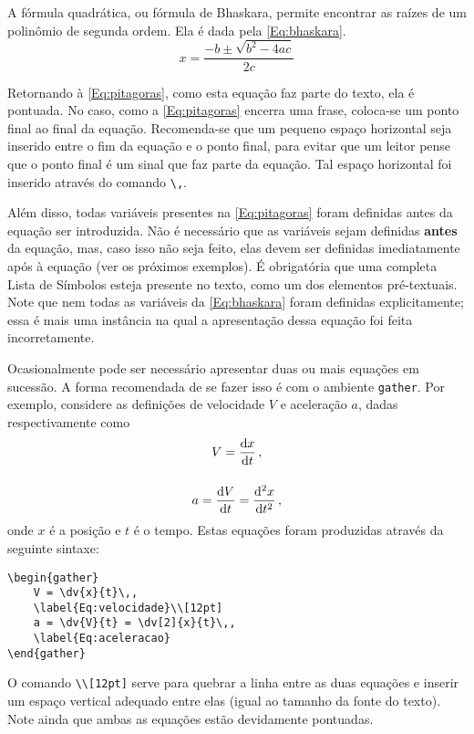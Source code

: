A fórmula quadrática, ou fórmula de Bhaskara, permite encontrar as raízes de um polinômio de segunda ordem. Ela é dada pela \cref{Eq:bhaskara}.
\begin{equation}
    x = \frac{-b \pm \sqrt{b^2 - 4ac}}{2c}
    \label{Eq:bhaskara}
\end{equation}

Retornando à \cref{Eq:pitagoras}, como esta equação faz parte do texto, ela é pontuada. No caso, como a \cref{Eq:pitagoras} encerra uma frase, coloca-se um ponto final ao final da equação. Recomenda-se que um pequeno espaço horizontal seja inserido entre o fim da equação e o ponto final, para evitar que um leitor pense que o ponto final é um sinal que faz parte da equação. Tal espaço horizontal foi inserido através do comando \lstinline!\,!.

Além disso, todas variáveis presentes na \cref{Eq:pitagoras} foram definidas antes da equação ser introduzida. Não é necessário que as variáveis sejam definidas \textbf{antes} da equação, mas, caso isso não seja feito, elas devem ser definidas imediatamente após à equação (ver os próximos exemplos). É obrigatória que uma completa Lista de Símbolos esteja presente no texto, como um dos elementos pré-textuais. Note que nem todas as variáveis da \cref{Eq:bhaskara} foram definidas explicitamente; essa é mais uma instância na qual a apresentação dessa equação foi feita incorretamente.

Ocasionalmente pode ser necessário apresentar duas ou mais equações em sucessão. A forma recomendada de se fazer isso é com o ambiente \lstinline!gather!. Por exemplo, considere as definições de velocidade $V$ e aceleração $a$, dadas respectivamente como
\begin{gather}
    V = \dv{x}{t}\,, 
    \label{Eq:velocidade}\\[12pt]
    a = \dv{V}{t} = \dv[2]{x}{t}\,,
    \label{Eq:aceleracao}
\end{gather}
onde $x$ é a posição e $t$ é o tempo. Estas equações foram produzidas através da seguinte sintaxe:
\begin{lstlisting}
\begin{gather}
    V = \dv{x}{t}\,, 
    \label{Eq:velocidade}\\[12pt]
    a = \dv{V}{t} = \dv[2]{x}{t}\,,
    \label{Eq:aceleracao}
\end{gather}
\end{lstlisting}
O comando \lstinline!\\[12pt]! serve para quebrar a linha entre as duas equações e inserir um espaço vertical adequado entre elas (igual ao tamanho da fonte do texto). Note ainda que ambas as equações estão devidamente pontuadas.

